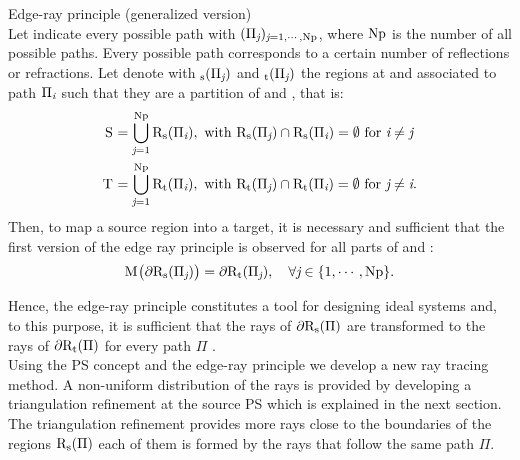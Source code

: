 \begin{lemma}{Edge-ray principle (generalized version)}\\
Let indicate every possible path with $(\Pi_{\textit{j}})_{\textit{j}=1, \cdots, \textrm{Np}}$, where $\textrm{Np}$ is the number of all possible paths.
Every possible path corresponds to a certain number of reflections or refractions.
Let denote with $_\textrm{s}(\Pi_{\textit{j}})$ and 
$_\textrm{t}(\Pi_{\textit{j}})$ the regions at  and  associated to path $\Pi_{\textit{i}}$ such that they are a partition of  and , that is:
\begin{equation*}
\begin{aligned}
\mbox{$\textup{S}_{\textit{}}$} &= \bigcup_{\textit{j}=1}^{\textrm{Np}} \mbox{$\textup{R}$}_\textrm{s}(\Pi_{\textit{i}}), \mbox{ with } \mbox{$\textup{R}$}_\textrm{s}(\Pi_{\textit{j}})\cap \mbox{$\textup{R}$}_\textrm{s}(\Pi_{\textit{i}}) = \emptyset \mbox{ for } \textit{i}\neq \textit{j}\\
\mbox{$\textup{T}_{\textit{}}$} & = \bigcup_{\textit{j}=1}^{\textrm{Np}} \mbox{$\textup{R}$}_\textrm{t}(\Pi_{\textit{i}}), \mbox{ with } \mbox{$\textup{R}$}_\textrm{t}(\Pi_{\textit{j}})\cap \mbox{$\textup{R}$}_\textrm{t}(\Pi_{\textit{i}}) = \emptyset \mbox{ for } \textit{j}\neq \textit{i}.
\end{aligned}
\end{equation*} 
Then, to map a source region into a target, it is necessary and sufficient that the first version of the edge ray principle is observed for all parts of  and : 
\begin{equation*}
\mathrm{M}_{\textit{}}\big(\partial\mbox{$\textup{R}$}_\textrm{s}(\Pi_{\textit{j}})\big) = \partial\mbox{$\textup{R}$}_\textrm{t}(\Pi_{\textit{j}}), \quad \forall \textit{j}\in\{1, \cdots, \textrm{Np}\}.
\end{equation*}
\end{lemma}
Hence, the edge-ray principle constitutes a tool for designing ideal systems and, to this purpose, it is sufficient that the rays of $\partial\mbox{$\textup{R}$}_\textrm{s}(\Pi)$ are transformed to the rays of $\partial\mbox{$\textup{R}$}_\textrm{t}(\Pi)$ for every path $\Pi$ \cite{minano1992new}. 
\\ \indent Using the PS concept and the edge-ray principle we develop a new ray tracing method. 
A non-uniform distribution of the rays is provided by developing a triangulation refinement at the source PS which is explained in the next section. 
The triangulation refinement provides more rays close to the boundaries of the regions $\mbox{$\textup{R}$}_\textrm{s}(\Pi)$ each of them is formed by the rays that follow the same path $\Pi$.

